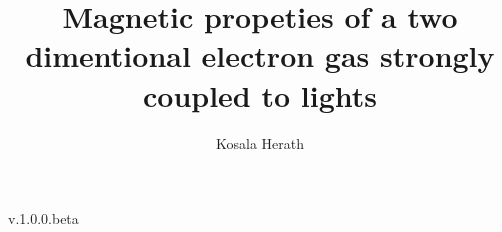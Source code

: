 \documentclass[a4paper]{article}
\title{Magnetic propeties of a two dimentional electron gas strongly coupled to lights}
\author{Kosala Herath}
\numberwithin{equation}{subsection}
\numberwithin{equation}{section}
\begin{document}
\maketitle

\begin{center}
{v.1.0.0.beta}
\end{center}


\newpage

\newpage

\newpage

\newpage

\newpage

\newpage

\end{document}
